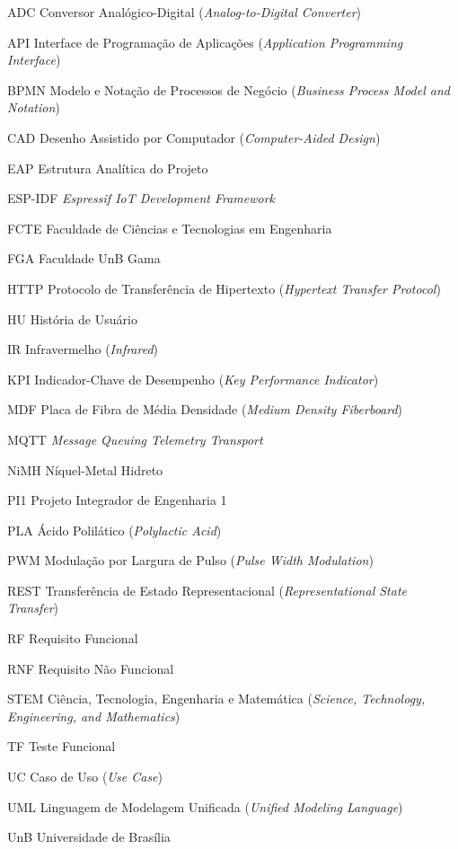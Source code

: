 \begin{siglas}
  \item[ADC] Conversor Analógico-Digital (\textit{Analog-to-Digital Converter})
  \item[API] Interface de Programação de Aplicações (\textit{Application Programming Interface})
  \item[BPMN] Modelo e Notação de Processos de Negócio (\textit{Business Process Model and Notation})
  \item[CAD] Desenho Assistido por Computador (\textit{Computer-Aided Design})
  \item[EAP] Estrutura Analítica do Projeto
  \item[ESP-IDF] \textit{Espressif IoT Development Framework}
  \item[FCTE] Faculdade de Ciências e Tecnologias em Engenharia
  \item[FGA] Faculdade UnB Gama
  \item[HTTP] Protocolo de Transferência de Hipertexto (\textit{Hypertext Transfer Protocol})
  \item[HU] História de Usuário
  \item[IR] Infravermelho (\textit{Infrared})
  \item[KPI] Indicador-Chave de Desempenho (\textit{Key Performance Indicator})
  \item[MDF] Placa de Fibra de Média Densidade (\textit{Medium Density Fiberboard}) 
  \item[MQTT] \textit{Message Queuing Telemetry Transport}
  \item[NiMH] Níquel-Metal Hidreto
  \item[PI1] Projeto Integrador de Engenharia 1
  \item[PLA] Ácido Polilático (\textit{Polylactic Acid})
  \item[PWM] Modulação por Largura de Pulso (\textit{Pulse Width Modulation})
  \item[REST] Transferência de Estado Representacional (\textit{Representational State Transfer})
  \item[RF] Requisito Funcional
  \item[RNF] Requisito Não Funcional
  \item[STEM] Ciência, Tecnologia, Engenharia e Matemática (\textit{Science, Technology, Engineering, and Mathematics})
  \item[TF] Teste Funcional
  \item[UC] Caso de Uso (\textit{Use Case})
  \item[UML] Linguagem de Modelagem Unificada (\textit{Unified Modeling Language})
  \item[UnB] Universidade de Brasília
\end{siglas}